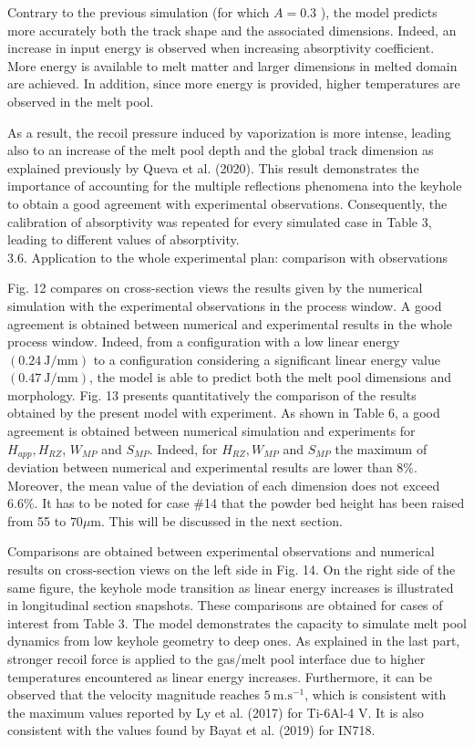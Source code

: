 \documentclass[10pt]{article}
\begin{document}
Contrary to the previous simulation (for which $A=0.3$ ), the model predicts more accurately both the track shape and the associated dimensions. Indeed, an increase in input energy is observed when increasing absorptivity coefficient. More energy is available to melt matter and larger dimensions in melted domain are achieved. In addition, since more energy is provided, higher temperatures are observed in the melt pool.

As a result, the recoil pressure induced by vaporization is more intense, leading also to an increase of the melt pool depth and the global track dimension as explained previously by Queva et al. (2020). This result demonstrates the importance of accounting for the multiple reflections phenomena into the keyhole to obtain a good agreement with experimental observations. Consequently, the calibration of absorptivity was repeated for every simulated case in Table 3, leading to different values of absorptivity.\\
3.6. Application to the whole experimental plan: comparison with observations

Fig. 12 compares on cross-section views the results given by the numerical simulation with the experimental observations in the process window. A good agreement is obtained between numerical and experimental results in the whole process window. Indeed, from a configuration with a low linear energy $(0.24 \mathrm{~J} / \mathrm{mm})$ to a configuration considering a significant linear energy value $(0.47 \mathrm{~J} / \mathrm{mm})$, the model is able to predict both the melt pool dimensions and morphology. Fig. 13 presents quantitatively the comparison of the results obtained by the present model with experiment. As shown in Table 6, a good agreement is obtained between numerical simulation and experiments for $H_{a p p}, H_{R Z}$, $W_{M P}$ and $S_{M P}$. Indeed, for $H_{R Z}, W_{M P}$ and $S_{M P}$ the maximum of deviation between numerical and experimental results are lower than 8\%. Moreover, the mean value of the deviation of each dimension does not exceed $6.6 \%$. It has to be noted for case \#14 that the powder bed height has been raised from 55 to $70 \mu \mathrm{m}$. This will be discussed in the next section.

Comparisons are obtained between experimental observations and numerical results on cross-section views on the left side in Fig. 14. On the right side of the same figure, the keyhole mode transition as linear energy increases is illustrated in longitudinal section snapshots. These comparisons are obtained for cases of interest from Table 3. The model demonstrates the capacity to simulate melt pool dynamics from low keyhole geometry to deep ones. As explained in the last part, stronger recoil force is applied to the gas/melt pool interface due to higher temperatures encountered as linear energy increases. Furthermore, it can be observed that the velocity magnitude reaches $5 \mathrm{~m} . \mathrm{s}^{-1}$, which is consistent with the maximum values reported by Ly et al. (2017) for Ti-6Al-4 V. It is also consistent with the values found by Bayat et al. (2019) for IN718.
\end{document}
